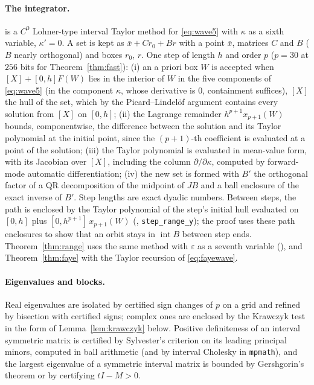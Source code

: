 \documentclass[11pt]{article}
\theoremstyle{definition}
\newcommand{\eps}{\varepsilon}
\begin{document}
\paragraph{The integrator.}  is a $C^0$ Lohner-type interval Taylor method \cite{lohner1987,tucker2011} for \eqref{eq:wave5} with $\kappa$ as a sixth variable, $\kappa' = 0$. A set is kept as $\bar x + Cr_0 + Br$ with a point $\bar x$, matrices $C$ and $B$ ($B$ nearly orthogonal) and boxes $r_0$, $r$. One step of length $h$ and order $p$ ($p = 30$ at $256$ bits for Theorem~\ref{thm:fast}): (i) an a priori box $W$ is accepted when $[X] + [0, h]F(W)$ lies in the interior of $W$ in the five components of \eqref{eq:wave5} (in the component $\kappa$, whose derivative is $0$, containment suffices), $[X]$ the hull of the set, which by the Picard--Lindel\"of argument contains every solution from $[X]$ on $[0, h]$; (ii) the Lagrange remainder $h^{p+1}x_{p+1}(W)$ bounds, componentwise, the difference between the solution and its Taylor polynomial at the initial point, since the $(p+1)$-th coefficient is evaluated at a point of the solution; (iii) the Taylor polynomial is evaluated in mean-value form, with its Jacobian over $[X]$, including the column $\partial/\partial\kappa$, computed by forward-mode automatic differentiation; (iv) the new set is formed with $B'$ the orthogonal factor of a QR decomposition of the midpoint of $JB$ and a ball enclosure of the exact inverse of $B'$. Step lengths are exact dyadic numbers. Between steps, the path is enclosed by the Taylor polynomial of the step's initial hull evaluated on $[0, h]$ plus $[0, h^{p+1}]\,x_{p+1}(W)$ (, \texttt{step\_range\_y}); the proof uses these path enclosures to show that an orbit stays in $\operatorname{int} B$ between step ends. Theorem~\ref{thm:range} uses the same method with $\eps$ as a seventh variable (), and Theorem~\ref{thm:faye} with the Taylor recursion of \eqref{eq:fayewave}.

\paragraph{Eigenvalues and blocks.} Real eigenvalues are isolated by certified sign changes of $p$ on a grid and refined by bisection with certified signs; complex ones are enclosed by the Krawczyk test \cite{krawczyk1969,rump2010} in the form of Lemma~\ref{lem:krawczyk} below. Positive definiteness of an interval symmetric matrix is certified by Sylvester's criterion on its leading principal minors, computed in ball arithmetic (and by interval Cholesky in \texttt{mpmath}), and the largest eigenvalue of a symmetric interval matrix is bounded by Gershgorin's theorem or by certifying $tI - M > 0$.
\end{document}
